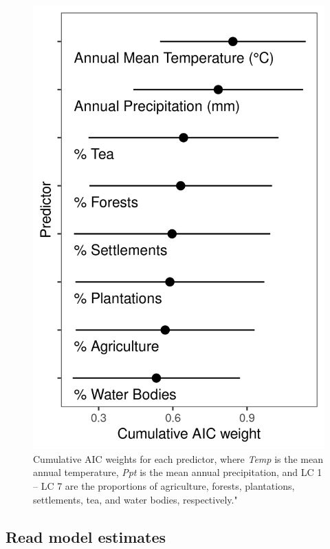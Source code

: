 \documentclass[]{article}
\begin{document}
\begin{figure}
\centering
\includegraphics{figs/fig_aic_weight.png}
\caption{Cumulative AIC weights for each predictor, where \emph{Temp} is the mean annual temperature, \emph{Ppt} is the mean annual precipitation, and LC 1 -- LC 7 are the proportions of agriculture, forests, plantations, settlements, tea, and water bodies, respectively."}
\end{figure}

\hypertarget{read-model-estimates}{%
\subsection{Read model estimates}\label{read-model-estimates}}
\end{document}
